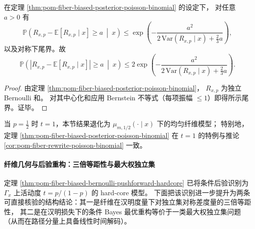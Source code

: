 

\begin{corollary}[偏置后验下逆代换次数的统一浓缩界]\label{cor:pom-fiber-biased-posterior-bernstein}
在定理 \ref{thm:pom-fiber-biased-posterior-poisson-binomial} 的设定下，
对任意 \(a>0\) 有
\[
\mathbb P\!\left(R_{x,p}-\mathbb E[R_{x,p}\mid x]\ge a\ \middle|\ x\right)
\le
\exp\!\left(
-\frac{a^2}{2\,\mathrm{Var}(R_{x,p}\mid x)+\frac{2}{3}a}
\right),
\]
以及对称下尾界。故
\[
\mathbb P\!\left(\left|R_{x,p}-\mathbb E[R_{x,p}\mid x]\right|\ge a\ \middle|\ x\right)
\le
2\exp\!\left(
-\frac{a^2}{2\,\mathrm{Var}(R_{x,p}\mid x)+\frac{2}{3}a}
\right).
\]
\end{corollary}
\begin{proof}
由定理 \ref{thm:pom-fiber-biased-posterior-poisson-binomial}，
\(
R_{x,p}
\)
为独立 Bernoulli 和。
对其中心化和应用 Bernstein 不等式（每项振幅 \(\le 1\)）即得所示尾界。证毕。
\end{proof}

\begin{remark}[与均匀纤维模型的一致性]\label{rem:pom-fiber-biased-specializes-uniform}
当 \(p=\frac12\) 时 \(t=1\)，本节结果退化为
\(
\mu_{m,1/2}(\cdot\mid x)
\)
下的均匀纤维模型；
特别地，定理 \ref{thm:pom-fiber-biased-posterior-poisson-binomial} 在 \(t=1\) 的特例与推论 \ref{cor:pom-fiber-rewrite-poisson-binomial} 一致。
\end{remark}

\paragraph{纤维几何与后验重构：三倍等距性与最大权独立集}
定理 \ref{thm:pom-fiber-biased-bernoulli-pushforward-hardcore} 已将条件后验识别为 \(\Gamma_x\) 上活动度 \(t=p/(1-p)\) 的 hard-core 模型。
下面把该识别进一步提升为两条可直接核验的结构结论：其一是纤维在汉明度量下对独立集对称差度量的三倍等距性，
其二是在汉明损失下的条件 Bayes 最优重构等价于一类最大权独立集问题（从而在路径分量上具备线性时间解码）。

